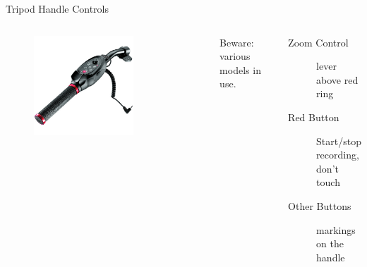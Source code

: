 \documentclass[hyperref={pdfpagelabels=false}]{beamer}
\begin{document}
\begin{frame}{Tripod Handle Controls}
	\begin{columns}[T,onlytextwidth]
	\begin{figure} 
		\centering
		\includegraphics[width=0.7\textwidth]{tripod-handle.jpeg}
	\end{figure}

	Beware: various models in use.
	\begin{description}
		\item[Zoom Control] lever above red ring
		\item[Red Button] Start/stop recording, don't touch
		\item[Other Buttons] markings on the handle
    \end{description}
	\end{columns}
\end{frame}
\end{document}

